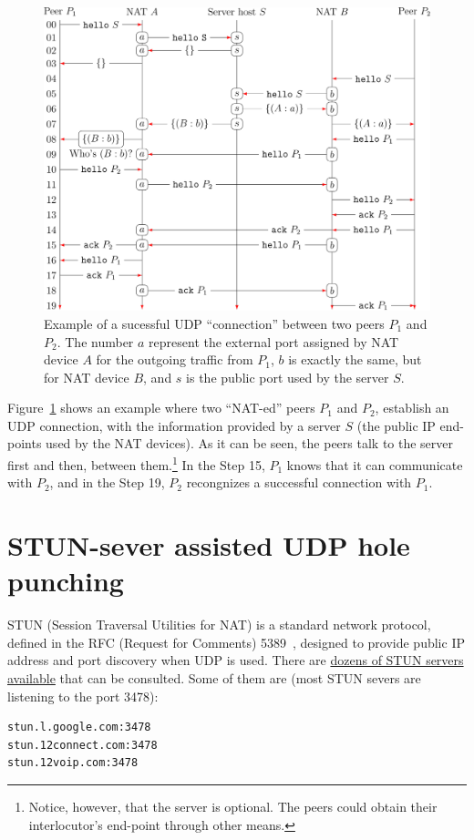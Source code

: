 \begin{figure}
  \includegraphics{graphics/UDP_Hole_Punching_RCN}
  \caption{Example of a sucessful UDP ``connection'' between two peers
    $P_1$ and $P_2$. The number $a$ represent the external port
    assigned by NAT device $A$ for the outgoing traffic from $P_1$,
    $b$ is exactly the same, but for NAT device $B$, and $s$ is the
    public port used by the server $S$.}
  \label{fig:UHP}
\end{figure}

Figure~\ref{fig:UHP} shows an example where two ``NAT-ed'' peers $P_1$
and $P_2$, establish an UDP connection, with the information provided
by a server $S$ (the public IP end-points used by the NAT devices). As
it can be seen, the peers talk to the server first and then, between
them.\footnote{Notice, however, that the server is optional. The peers
  could obtain their interlocutor's end-point through other means.} In
the Step 15, $P_1$ knows that it can communicate with $P_2$, and in
the Step 19, $P_2$ recongnizes a successful connection with $P_1$.

\section{STUN-sever assisted UDP hole punching}

STUN (Session Traversal Utilities for NAT) is a standard network
protocol, defined in the RFC (Request for Comments) 5389~\cite{STUN},
designed to provide public IP address and port discovery when UDP is
used. There are
\href{https://gist.github.com/mondain/b0ec1cf5f60ae726202e}{dozens of
  STUN servers available} that can be consulted. Some of them are
(most STUN severs are listening to the port 3478):
\begin{verbatim}
stun.l.google.com:3478
stun.12connect.com:3478
stun.12voip.com:3478
\end{verbatim}

